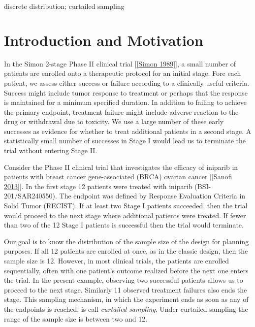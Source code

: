 \documentclass[12pt]{article}         %
\begin{document}
\bigskip

  discrete distribution; curtailed sampling


\thispagestyle{empty}
\setcounter{page}{1}

\section            {Introduction and Motivation}


In the Simon 2-stage Phase II clinical trial [\ref{Simon 1989}], a small 
number of patients are enrolled onto a therapeutic 
protocol for an initial stage. Fore each patient, we assess either success 
or failure according to a 
clinically useful criteria. Success might include tumor response to treatment
or perhaps that the response is maintained for a minimum specified duration.
In addition to failing to achieve the primary endpoint, treatment failure 
might include adverse reaction to the drug or withdrawal due to toxicity. We 
use a large number of these early successes as evidence for whether to treat
additional patients in a second stage. A statistically small number of 
successes in Stage I would lead us to terminate the trial without entering 
Stage II.

Consider the Phase II clinical trial that investigates the efficacy of 
iniparib in patients with breast cancer gene-associated (BRCA) ovarian 
cancer [\ref{Sanofi 2013}]. In the first stage 12 patients were treated with 
iniparib (BSI-201/SAR240550). The endpoint was defined by Response Evaluation 
Criteria in Solid Tumor (RECIST). If at least two Stage I patients succeeded,
then the trial would proceed to the next stage where additional patients were 
treated. If fewer than two of the 12 Stage I patients is successful then 
the trial would terminate. 

Our goal is to know the distribution of the sample size of the design for 
planning purposes.  If all 12 patients are enrolled at once, as in the classic 
design, then the sample size is 12. However, in most clinical trials, the 
patients are enrolled sequentially, often with one patient's outcome realized 
before the next one enters the trial. In the present example, observing two 
successful patients allows us to proceed to the next stage. Similarly 11 
observed treatment failures also ends the stage. This sampling mechanism, in 
which the experiment ends as soon as any of the endpoints is reached, is 
call {\em curtailed sampling}. Under curtailed sampling the range of the 
sample size is between two and 12.
\end{document}
